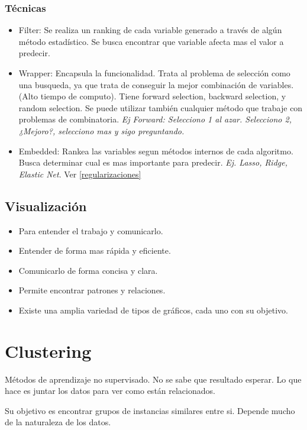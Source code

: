 \documentclass[titlepage,a4paper]{article}
\begin{document}
\subsubsection*{Técnicas}
\begin{itemize}
    \item Filter: Se realiza un ranking de cada variable generado a través de algún método estadístico. Se busca encontrar que variable afecta mas el valor a predecir.
    \item Wrapper: Encapsula la funcionalidad. Trata al problema de selección como una busqueda, ya que trata de conseguir la mejor combinación de variables. (Alto tiempo de computo). Tiene forward selection, backward selection, y random selection. Se puede utilizar también cualquier método que trabaje con problemas de combinatoria. \textit{Ej Forward: Selecciono 1 al azar. Selecciono 2, ¿Mejoro?, selecciono mas y sigo preguntando.}
    \item Embedded: Rankea las variables segun métodos internos de cada algoritmo. Busca determinar cual es mas importante para predecir. \textit{Ej. Lasso, Ridge, Elastic Net}. Ver \ref{regularizaciones}
\end{itemize}

\subsection{Visualización}
\begin{itemize}
    \item Para entender el trabajo y comunicarlo.
    \item Entender de forma mas rápida y eficiente.
    \item Comunicarlo de forma concisa y clara.
    \item Permite encontrar patrones y relaciones.
    \item Existe una amplia variedad de tipos de gráficos, cada uno con su objetivo.
\end{itemize}




\section{Clustering}

Métodos de aprendizaje no supervisado. No se sabe que resultado esperar. Lo que hace es juntar los datos para ver como están relacionados.

Su objetivo es encontrar grupos de instancias similares entre si. Depende mucho de la naturaleza de los datos.
\end{document}
